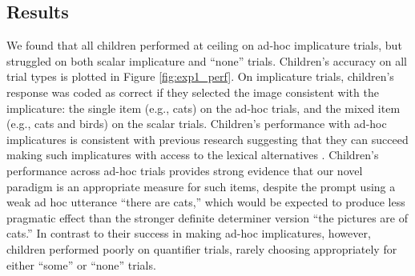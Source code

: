 \documentclass[man]{apa2}
\begin{document}
\subsection{Results}

We found that all children performed at ceiling on ad-hoc implicature trials, but struggled on both scalar implicature and ``none'' trials. Children's accuracy on all trial types is plotted in Figure \ref{fig:exp1_perf}. On implicature trials, children's response was coded as correct if they selected the image consistent with the implicature: the single item (e.g., cats) on the ad-hoc trials, and the mixed item (e.g., cats and birds) on the scalar trials. Children's performance with ad-hoc implicatures is consistent with previous research suggesting that they can succeed making such implicatures with access to the lexical alternatives \cite{stiller2015}. Children's performance across ad-hoc trials provides strong evidence that our novel paradigm is an appropriate measure for such items, despite the prompt using a weak ad hoc utterance ``there are cats,'' which would be expected to produce less pragmatic effect than the stronger definite determiner version ``the pictures are of cats.'' In contrast to their success in making ad-hoc implicatures, however, children performed poorly on quantifier trials, rarely choosing appropriately for either ``some'' or ``none'' trials.


\end{document}
